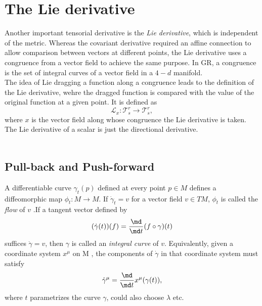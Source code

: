 \section{The Lie derivative}
Another important tensorial derivative is the \emph{Lie derivative}, which is independent of the metric. Whereas the covariant derivative required an affine connection to allow comparison between vectors at different points, the Lie derivative uses a congruence from a vector field to achieve the same purpose. In GR, a congruence is the set of integral curves of a vector field in a $4-d$ manifold.\\
The idea of Lie dragging a function along a congruence leads to the definition of the Lie derivative, wehre the dragged function is compared with the value of the original function at a given point. It is defined as 
\begin{equation}
\mathcal{L}_x :\mathcal{T}^r_s \rightarrow \mathcal{T}^r_s,
\end{equation}
where $x$ is the vector field along whose congruence the Lie derivative is taken.\\
The Lie derivative of a scalar is just the directional derivative.\\
\\
\subsection{Pull-back and Push-forward}
A differentiable curve $\gamma_t(p)$ defined at every point $p \in M$ defines a diffeomorphic map $\phi_t:M\rightarrow M$. If $\dot{\gamma}_t=v$ for a vector field $v \in TM$, $\phi_t$ is called the \emph{flow} of $v$ .If a tangent vector defined by 
\begin{equation}
	(\dot{\gamma}(t))(f) = \frac{\md }{\md t} (f \circ \gamma) (t)
\end{equation}
suffices $\dot{\gamma}=v$, then $\gamma$ is called an \emph{integral curve} of $v$. Equivalently, given a coordinate system $x^μ$ on
M , the components of $\dot{\gamma}$ in that coordinate system must satisfy
\begin{equation}
	\dot{\gamma}^\mu = \frac{\md}{\md t} x^\mu (\gamma(t)),
\end{equation}
where $t$ parametrizes the curve $\gamma$, could also choose $\lambda$ etc.\\

